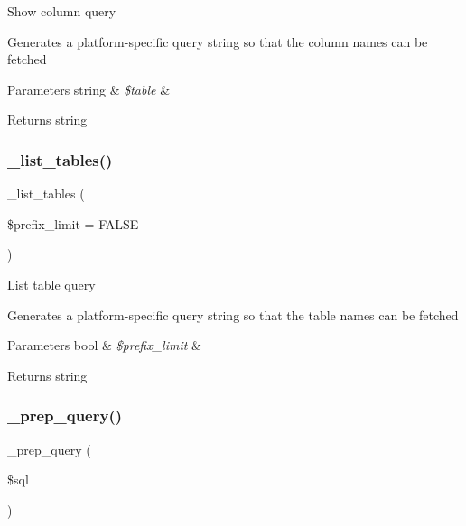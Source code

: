 Show column query

Generates a platform-\/specific query string so that the column names can be fetched


\begin{DoxyParams}[1]{Parameters}
string & {\em \$table} & \\
\hline
\end{DoxyParams}
\begin{DoxyReturn}{Returns}
string 
\end{DoxyReturn}
\mbox{\label{class_c_i___d_b__mysqli__driver_a435c0f3ce54fe7daa178baa8532ebd54}} 
\subsubsection{\texorpdfstring{\+\_\+list\+\_\+tables()}{\_list\_tables()}}
{\footnotesize\ttfamily \+\_\+list\+\_\+tables (\begin{DoxyParamCaption}\item[{}]{\$prefix\+\_\+limit = {\ttfamily FALSE} }\end{DoxyParamCaption})\hspace{0.3cm}{\ttfamily [protected]}}

List table query

Generates a platform-\/specific query string so that the table names can be fetched


\begin{DoxyParams}[1]{Parameters}
bool & {\em \$prefix\+\_\+limit} & \\
\hline
\end{DoxyParams}
\begin{DoxyReturn}{Returns}
string 
\end{DoxyReturn}
\mbox{\label{class_c_i___d_b__mysqli__driver_a86af88ef0fa6d44ab4691e3f53270339}} 
\subsubsection{\texorpdfstring{\+\_\+prep\+\_\+query()}{\_prep\_query()}}
{\footnotesize\ttfamily \+\_\+prep\+\_\+query (\begin{DoxyParamCaption}\item[{}]{\$sql }\end{DoxyParamCaption})\hspace{0.3cm}{\ttfamily [protected]}}


